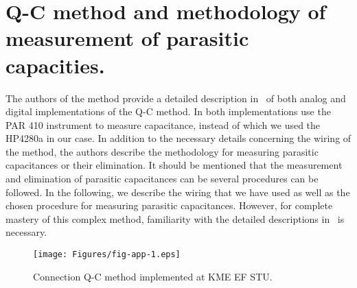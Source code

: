 
\chapter{Q-C method and methodology of measurement of parasitic capacities.}\label{app:AppendixE}

The authors of the method provide a detailed description
in~\cite{App.2, App.3, App.4} of both analog and digital
implementations of the Q-C method.  In both implementations use the
PAR 410 instrument to measure capacitance, instead of which we used
the HP4280a in our case. In addition to the necessary details
concerning the wiring of the method, the authors describe the
methodology for measuring parasitic capacitances or their
elimination. It should be mentioned that the measurement and
elimination of parasitic capacitances can be several procedures can be
followed. In the following, we describe the wiring that we have used
as well as the chosen procedure for measuring parasitic
capacitances. However, for complete mastery of this complex method,
familiarity with the detailed descriptions in~\cite{App.2, App.3,
  App.4} is necessary.

\begin{figure}[h!]\centering
  \texttt{[image: Figures/fig-app-1.eps]}
  \caption[Engagement Q-C method implemented on KME EF
    STU.]{Connection Q-C method implemented at KME EF
    STU.}\label{fig:App.1}
\end{figure}

